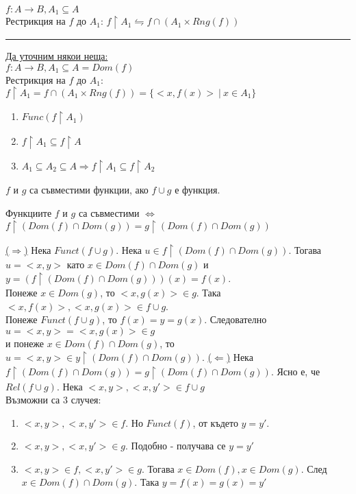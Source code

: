 \documentclass[fleqn, titlepage, 12pt]{report}
\begin{document}
$f: A \rightarrow B, A_1 \subseteq A$\\
Рестрикция на $f$ до $A_1$: $f \upharpoonright A_1 \leftrightharpoons f \cap (A_1 \times Rng(f))$
\bigbreak

\bigbreak
\hrule
\bigbreak
\underline{Да уточним някои неща:} \\
$ f : A \rightarrow B, A_1 \subseteq A = Dom(f) $\\
Рестрикция на $f$ до $ A_1 $: $ f \upharpoonright A_1 = f \cap (A_1 \times Rng(f)) = \{<x,f(x)>\ |\ x \in A_1\}  $
\begin{enumerate}
  \item $ Func(f \upharpoonright A_1) $
  \item $ f \upharpoonright A_1 \subseteq f \upharpoonright A$
  \item $ A_1 \subseteq A_2 \subseteq A \Rightarrow f \upharpoonright A_1 \subseteq f \upharpoonright A_2$
\end{enumerate}
\bigbreak

 $ f $ и $ g $ са съвместими функции, ако $f \cup g$ е функция.
\bigbreak

 Функциите $f$ и $ g $ са съвместими $ \Leftrightarrow  $ $f \upharpoonright (Dom(f) \cap Dom(g)) =
g \upharpoonright (Dom(f) \cap Dom(g))$
\bigbreak

\underline{($ \Rightarrow $)} Нека $Funct(f \cup g)$. Нека $ u \in f \upharpoonright (Dom(f) \cap Dom(g))$.
Тогава $u = <x,y>$ като $ x \in Dom(f) \cap Dom(g)$ и $ y = (f \upharpoonright (Dom(f) \cap Dom(g)))(x) = f(x) $.\\
Понеже $x \in Dom(g)$, то $ <x,g(x)> \in g $. Така $<x,f(x)>, <x,g(x)> \in f \cup g$.\\
Понеже $Funct(f \cup g)$,
то $f(x) = y = g(x)$. Следователно $u = <x,y> = <x,g(x)> \in g$\\
и понеже $x \in Dom(f) \cap Dom(g)$, то $u = <x,y> \in y \upharpoonright (Dom(f) \cap Dom(g))$.
\bigbreak
\underline{($\Leftarrow$)} Нека $f \upharpoonright (Dom(f) \cap Dom(g)) = g \upharpoonright (Dom(f) \cap Dom(g))$.
Ясно е, че $Rel(f \cup g)$. Нека $<x,y>, <x,y'> \in f \cup g$ \\
Възможни са 3 случея:
\begin{enumerate}
  \item $<x,y>, <x,y'> \in f$. Но $Funct(f)$, от където $y = y'$.
  \item $<x,y>,<x,y'> \in g$. Подобно - получава се $y = y'$
  \item $<x,y> \in f , <x,y'> \in g$. Тогава $x \in Dom(f), x \in Dom(g)$. След $x \in Dom(f) \cap Dom(g)$.
    Така $y = f(x) = g(x) = y'$
\end{enumerate}
\bigbreak
\end{document}

